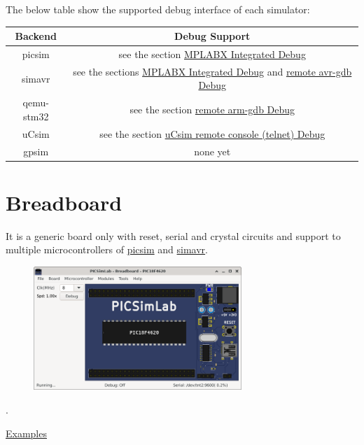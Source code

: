 The below table show the supported debug interface of each simulator:

\begin{center}
\begin{tabular}{c|c}
\hline \textbf{Backend} & \textbf{Debug Support}\\
\hline picsim & see the section \hyperlink{def:mplabxd}{MPLABX Integrated Debug}\\
\hline simavr & see the sections \hyperlink{def:mplabxd}{MPLABX Integrated Debug} and \hyperlink{def:gdbavr}{remote avr-gdb Debug}\\
\hline qemu-stm32 & see the section \hyperlink{def:gdbarm}{remote arm-gdb Debug}\\
\hline uCsim & see the section \hyperlink{def:ucsim}{uCsim remote console (telnet) Debug}\\
\hline gpsim & none yet\\
\hline 
\end{tabular}
\end{center}



\section{Breadboard}

It is a generic board only with reset, serial and crystal circuits and support to multiple microcontrollers 
of \href{https://github.com/lcgamboa/picsim}{picsim} and \href{https://github.com/buserror/simavr}{simavr}.

\begin{figure}[H]
\center
\includegraphics[width=0.7\textwidth]{img/picsimlab0.png} 
\end{figure} 

.\vspace{0.5cm}

\href{https://lcgamboa.github.io/picsimlab_examples/board_Breadboard.html}{Examples}

